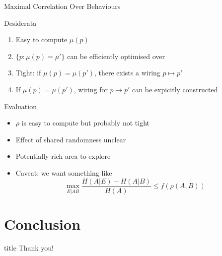 \documentclass[xcolor=dvipsnames]{beamer}
\newcommand{\?}{\mathrel{?}} %
\begin{document}
\begin{frame}{Maximal Correlation Over Behaviours}
\end{frame}

\begin{frame}{Desiderata}
  \begin{enumerate}[<+->]
    \item Easy to compute \(\mu(p)\)
    \item \(\{ p : \mu(p) = \mu' \}\) can be efficiently optimised over
    \item Tight: if \(\mu(p) = \mu(p')\), there exists a wiring \(p \mapsto p'\)
    \item If \(\mu(p) = \mu(p')\), wiring for \(p \mapsto p'\) can be expicitly constructed
  \end{enumerate}
\end{frame}

\begin{frame}{Evaluation}
  \begin{itemize}[<+->]
    \item \(\rho\) is easy to compute but probably not tight
    \item Effect of shared randomness unclear
    \item Potentially rich area to explore
    \item Caveat: we want something like
      \[ \max_{E|AB} \frac{H(A|E) - H(A|B)}{H(A)} \leq f(\rho(A,B)) \]
  \end{itemize}
\end{frame}

\section*{Conclusion}

\begin{frame}[c]{}
  \begin{center}
    \begin{beamercolorbox}[sep=8pt,center,shadow=true,rounded=true]{title}
      Thank you!
    \end{beamercolorbox}
  \end{center}
\end{frame}

\end{document}
